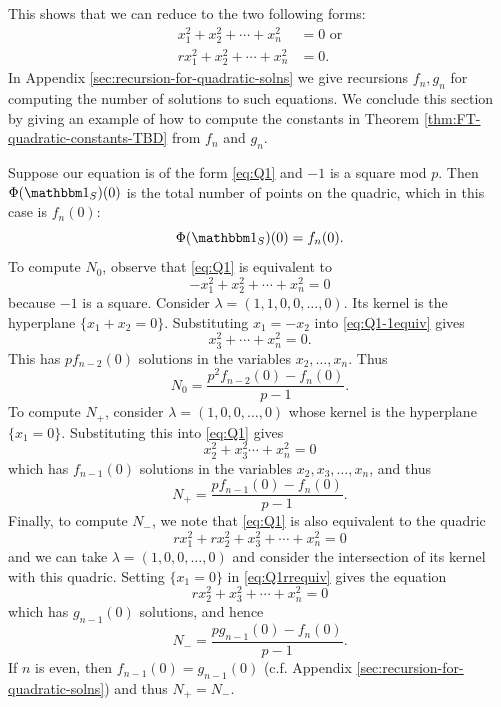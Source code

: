 This shows that we can reduce to the two following forms:
\begin{align}
x_1^2 + x_2^2 + \cdots + x_n^2 &= 0\text{ or} \tag{Q1}\label{eq:Q1}\\ 
rx_1^2 + x_2^2 + \cdots + x_n^2 &= 0. \tag{Q2}\label{eq:Q2}
\end{align}
In Appendix \ref{sec:recursion-for-quadratic-solns} we give recursions $f_n, g_n$ for computing the number of solutions to such equations. We conclude this section by giving an example of how to compute the constants in Theorem \ref{thm:FT-quadratic-constants-TBD} from $f_n$ and $g_n$.

\begin{example}
	Suppose our equation is of the form \eqref{eq:Q1} and $-1$ is a square mod $p$. Then $\Phi(\IND_S)(0)$ is the total number of points on the quadric, which in this case is $f_n (0)$:
	\[
		\Phi(\IND_S)(0) = f_n(0).
	\]
	To compute $N_0$, observe that \eqref{eq:Q1} is equivalent to
	\begin{equation}\label{eq:Q1-1equiv}
		-x_1^2 + x_2^2 + \cdots + x_n^2 = 0
	\end{equation}
	because $-1$ is a square. Consider $\lambda = (1,1,0,0,\ldots,0)$. Its kernel is the hyperplane $\{x_1 + x_2 = 0\}$. Substituting $x_1 = -x_2$ into \eqref{eq:Q1-1equiv} gives
	\[
	x_3^2 + \cdots + x_n^2 = 0.
	\]
	This has $p f_{n-2}(0)$ solutions in the variables $x_2,\ldots,x_n$. Thus
	\[
	N_0 = \frac{p^2 f_{n-2}(0) - f_n(0)}{p-1}.
	\]
	To compute $N_+$, consider $\lambda = (1,0,0,\ldots,0)$ whose kernel is the hyperplane $\{x_1 = 0\}$. Substituting this into \eqref{eq:Q1} gives
	\[
	x_2^2 + x_3^2 \cdots + x_n^2 = 0
	\]
	which has $f_{n-1}(0)$ solutions in the variables $x_2,x_3,\ldots,x_n$, and thus
	\[
	N_+ = \frac{p f_{n-1}(0) - f_n(0)}{p-1}.
	\]
	Finally, to compute $N_-$, we note that \eqref{eq:Q1} is also equivalent to the quadric
	\begin{equation}\label{eq:Q1rrequiv}
		rx_1^2 + rx_2^2 + x_3^2 + \cdots + x_n^2 = 0
	\end{equation}
	and we can take $\lambda = (1,0,0,\ldots,0)$ and consider the intersection of its kernel with this quadric. Setting $\{x_1 = 0\}$ in \eqref{eq:Q1rrequiv} gives the equation
	\[
		rx_2^2 + x_3^2 + \cdots + x_n^2 = 0
	\]
	which has $g_{n-1}(0)$ solutions, and hence
	\[
		N_- = \frac{pg_{n-1}(0) - f_n(0)}{p-1}.
	\]
	If $n$ is even, then $f_{n-1}(0) = g_{n-1}(0)$ (c.f. Appendix \ref{sec:recursion-for-quadratic-solns}) and thus $N_+ = N_-$.
\end{example}
